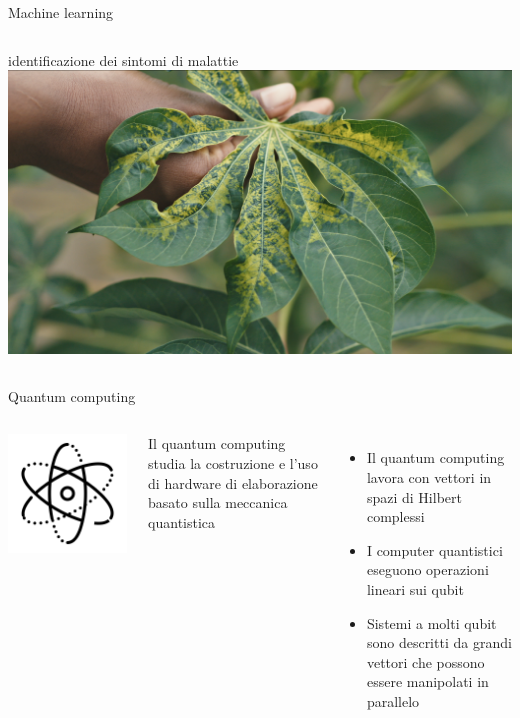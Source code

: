 \documentclass{beamer}
\begin{document}
\begin{frame}{Machine learning}
\begin{columns}
            \begin{columns}
                identificazione dei sintomi di malattie
                \includegraphics[width=\columnwidth]{gfx/pianta_malata.png}
            \end{columns}
        \end{columns}
    \end{frame}

    \begin{frame}{Quantum computing}
        \begin{columns}
            \begin{center}
                \includegraphics[width=.5\columnwidth]{gfx/icons/icons8-physics-480}                
            \end{center}
            
            Il quantum computing studia la costruzione e l'uso di hardware di elaborazione basato sulla meccanica quantistica
            \begin{itemize}
                \item Il quantum computing lavora con vettori in spazi di Hilbert complessi
                \item I computer quantistici eseguono operazioni lineari sui qubit
                \item Sistemi a molti qubit sono descritti da grandi vettori che possono essere manipolati in parallelo
            \end{itemize}
        \end{columns}
    \end{frame}
\end{document}
